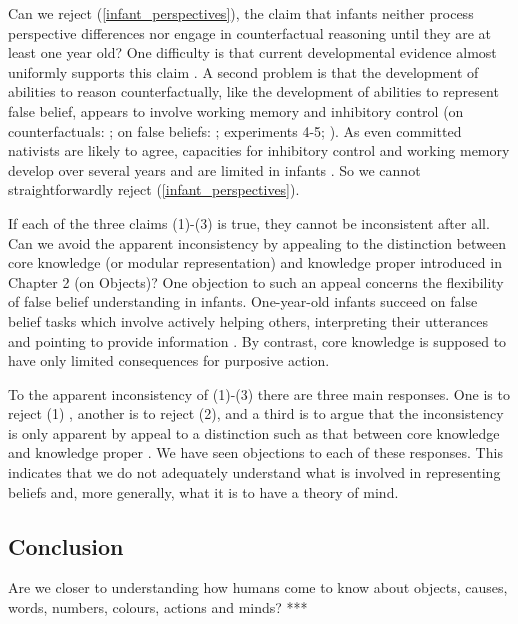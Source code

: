 \documentclass[12pt,\papersize]{extarticle}
\begin{document}
Can we reject (\ref{infant_perspectives}), the claim that infants neither process perspective differences nor engage in counterfactual reasoning until they are at least one year old?
One difficulty is that current developmental evidence almost uniformly supports this claim  \citep{rafetseder:2010_counterfactual,beck:2011_almost}.
A second problem is that the development of abilities to reason counterfactually,
like the development of abilities to represent false belief,
appears to involve working memory and inhibitory control 
(on counterfactuals: 
	\citealp{drayton:2011_counterfactual,beck:2011_supporting};
on false beliefs: \citealp{apperly:2008_back, Apperly:2009cc}; \citealp{lin:2010_reflexively, McKinnon:2007rr} experiments 4-5; \citealp{saxe_reading_2006}).
As even committed nativists are likely to agree, capacities for inhibitory control and working memory develop over several years and are limited in infants \citep[e.g.][]{carlson:2005_developmentally}.
So we cannot straightforwardly reject (\ref{infant_perspectives}).



If each of the three claims (1)-(3) is true, they cannot be inconsistent after all. 
Can we avoid the apparent inconsistency by appealing to the distinction between core knowledge (or modular representation) and knowledge proper introduced in Chapter 2 (on Objects)?  
One objection to such an appeal concerns the flexibility of false belief understanding in infants.
One-year-old infants succeed on false belief tasks which involve actively helping others, interpreting their utterances and pointing to provide information \citep{Buttelmann:2009gy,Knudsen:2011fk,southgate:2010fb}. 
By contrast, core knowledge is supposed to have only limited consequences for purposive action.

To the apparent inconsistency of (1)-(3) there are three main responses.
One is to reject (1) \citep[e.g.][]{Perner:2005hq}, 
another is to reject (2),
 and a third is to argue that the inconsistency is only apparent by appeal to a distinction such as that between core knowledge and knowledge proper \citep[e.g.][]{Clements:1994cw,low:2010_preschoolers}.
We have seen objections to each of these responses.
This indicates that we do not adequately understand what is involved in representing beliefs and, more generally, what it is to have a theory of mind.


\subsection{Conclusion}
Are we closer to understanding 
how humans come to know about %
objects,
causes,
words,
numbers,
colours,
actions
and
minds? 
***



\end{document}
